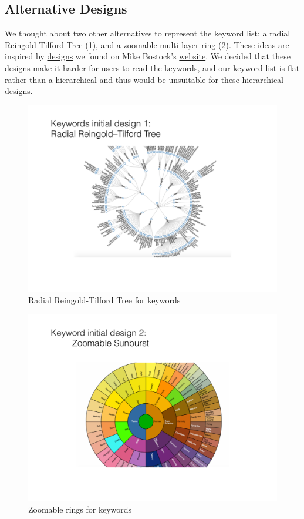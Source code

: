 \documentclass[12pt]{article}
\begin{document}
\subsection{Alternative Designs}

We thought about two other alternatives to represent the keyword list: a radial Reingold-Tilford Tree (\ref{fig:radial_tree}), and a zoomable multi-layer ring (\ref{fig:zoomable_ring}). These ideas are inspired by \href{http://bl.ocks.org/mbostock/4063550}{designs} we found on Mike Bostock's \href{http://bl.ocks.org/metmajer/5480307}{website}. We decided that these designs make it harder for users to read the keywords, and our keyword list is flat rather than a hierarchical and thus would be unsuitable for these hierarchical designs.

\begin{figure}[htb!]
    \centering
    \includegraphics[width=160mm]{visproposalDrawing_page_Part_9.pdf}
    \caption{Radial Reingold-Tilford Tree for keywords}
    \label{fig:radial_tree}
\end{figure}

\begin{figure}[htb!]
    \centering
    \includegraphics[width=160mm]{visproposalDrawing_page_Part_10.pdf}
    \caption{Zoomable rings for keywords}
    \label{fig:zoomable_ring}
\end{figure}
\end{document}
